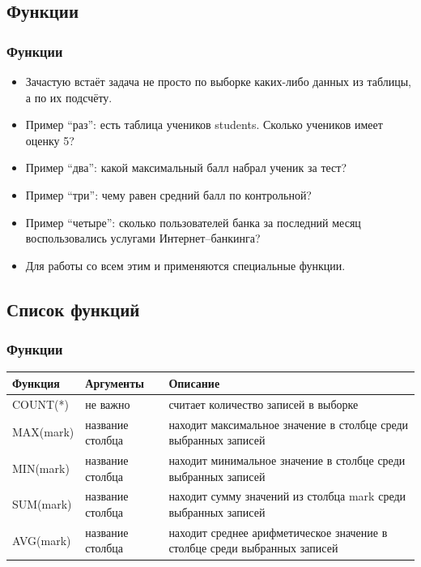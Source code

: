\documentclass[compress,red]{beamer}
\begin{document}
\subsection{Функции}
\begin{frame}[fragile]
  \frametitle{Функции}
  \begin{itemize}[<+->]
    \item Зачастую встаёт задача не просто по выборке каких-либо данных из таблицы, а по их подсчёту.
    \item Пример ``раз'': есть таблица учеников students. Сколько учеников имеет оценку 5?
    \item Пример ``два'': какой максимальный балл набрал ученик за тест?
    \item Пример ``три'': чему равен средний балл по контрольной?
    \item Пример ``четыре'': сколько пользователей банка за последний месяц воспользовались услугами Интернет--банкинга?
    \item Для работы со всем этим и применяются специальные функции. 
  \end{itemize}
\end{frame}

\subsection{Список функций}
\begin{frame}[fragile]
  \frametitle{Функции}
  \begin{tabular}{lp{2cm}p{6cm}}
    \hline
    \hline
    Функция & Аргументы & Описание \\
    \hline
    COUNT(*) & не важно & считает количество записей в выборке \\
    \hline
    MAX(mark) & название столбца & находит максимальное значение в столбце среди выбранных записей \\
    \hline
    MIN(mark) & название столбца & находит минимальное значение в столбце среди выбранных записей \\
    \hline
    SUM(mark) & название столбца & находит сумму значений из столбца mark среди выбранных записей \\
    \hline
    AVG(mark) & название столбца & находит среднее арифметическое значение в столбце среди выбранных записей \\
    \hline
    \hline
  \end{tabular}
\end{frame}
\end{document}

